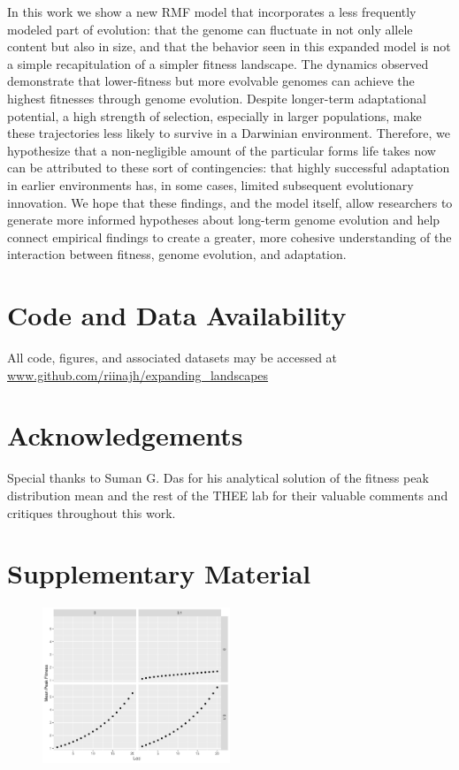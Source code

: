 \documentclass[paper=a4, fontsize=11pt,twoside]{scrartcl}       %
\newcommand{\beginsupplement}{
        \setcounter{table}{0}
        \renewcommand{\thetable}{S\arabic{table}}%
        \setcounter{figure}{0}
        \renewcommand{\thefigure}{S\arabic{figure}}%
     }
\begin{document}
In this work we show a new RMF model that incorporates a less frequently modeled part of evolution: that the genome can fluctuate in not only allele content but also in size, and that the behavior seen in this expanded model is not a simple recapitulation of a simpler fitness landscape. The dynamics observed demonstrate that lower-fitness but more evolvable genomes can achieve the highest fitnesses through genome evolution. Despite longer-term adaptational potential, a high strength of selection, especially in larger populations, make these trajectories less likely to survive in a Darwinian environment. Therefore, we hypothesize that a non-negligible amount of the particular forms life takes now can be attributed to these sort of contingencies: that highly successful adaptation in earlier environments has, in some cases, limited subsequent evolutionary innovation. We hope that these findings, and the model itself, allow researchers to generate more informed hypotheses about long-term genome evolution and help connect empirical findings to create a greater, more cohesive understanding of the interaction between fitness, genome evolution, and adaptation. 

\section*{Code and Data Availability}

All code, figures, and associated datasets may be accessed at \url{www.github.com/riinajh/expanding_landscapes}

\section*{Acknowledgements}

Special thanks to Suman G. Das for his analytical solution of the fitness peak distribution mean and the rest of the THEE lab for their valuable comments and critiques throughout this work.

\printbibliography

\section*{Supplementary Material}

\beginsupplement

\begin{figure}[h!]
	\centering
	\includegraphics[width = 0.5\textwidth]{figures/mean_peak_scaling.pdf}
	\caption{}
	\label{supp:peak_scaling}
\end{figure}
\end{document}
